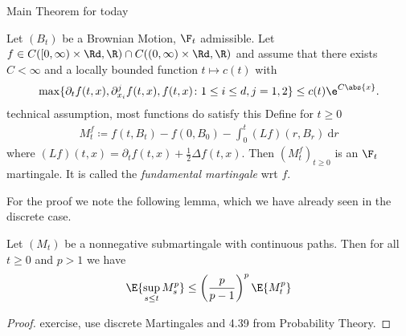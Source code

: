 Main Theorem for today
\begin{thm}
Let $(B_t)$ be a Brownian Motion, $\F_t$ admissible.
Let $f \in C([0,\infty)\times \Rd,\R)\cap C((0,\infty) \times \Rd,\R)$ and assume that there exists $C<\infty$ and a locally bounded function $t \mapsto c(t)$ with
\begin{align*}
\max\{\partial_t f(t,x),\partial_{x_i}^j f(t,x),f(t,x)\colon 1 \leq i \leq d,j=1,2\}\leq c(t)\e^{C\abs{x}}.
\end{align*}
technical assumption, most functions do satisfy this
Define for $t\geq0$
\begin{align*}
M_t^f\coloneqq f(t,B_t)-f(0,B_0)-\int_0^t (Lf)(r,B_r)~\mathrm{d}r
\end{align*}
where $(Lf)(t,x)=\partial_t f(t,x)+\frac{1}{2}\Delta f(t,x)$.
Then $(M_t^f)_{t \geq 0}$ is an $\F_t$ martingale.
It is called the \emph{fundamental martingale} wrt $f$.
\end{thm}
For the proof we note the following lemma, which we have already seen in the discrete case.
\begin{lem}
Let $(M_t)$ be a nonnegative submartingale with continuous paths. Then for all $t\geq 0$ and $p>1$ we have
\begin{align*}
\E{\sup_{s\leq t} M_s^p}\leq \left(\frac{p}{p-1}\right)^p \E{M_t^p}
\end{align*}
\end{lem}
\begin{proof}
exercise, use discrete Martingales and 4.39 from Probability Theory.
\end{proof}

